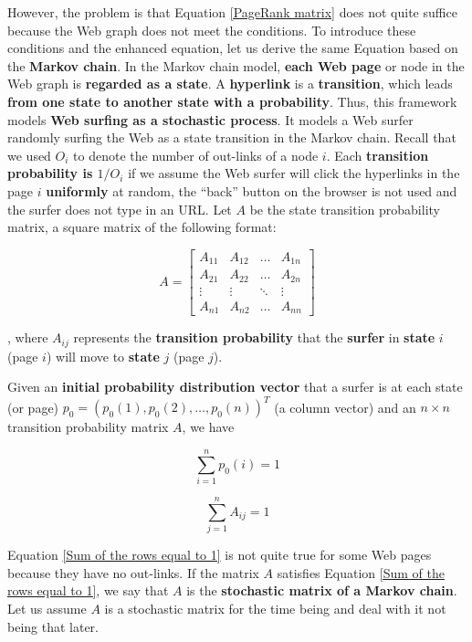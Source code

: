 However, the problem is that Equation \ref{PageRank matrix} does not quite suffice because the Web graph does not meet the conditions. To introduce these conditions and the enhanced equation, let us derive the same Equation based on the \textbf{Markov chain}. In the Markov chain model, \textbf{each Web page} or node in the Web graph is \textbf{regarded as a state}. A \textbf{hyperlink} is a \textbf{transition}, which leads \textbf{from one state to another state with a probability}. Thus, this framework models \textbf{Web surfing as a stochastic process}. It models a Web surfer randomly surfing the Web as a state transition in the Markov chain. Recall that we used $O_i$ to denote the number of out-links of a node $i$. Each \textbf{transition probability is $1/O_i$} if we assume the Web surfer will click the hyperlinks in the page $i$ \textbf{uniformly} at random, the “back” button on the browser is not used and the surfer does not type in an URL. Let $A$ be the state transition probability matrix, a square matrix of the following format:

$$
A = \begin{bmatrix}
A_{11} & A_{12} & \hdots & A_{1n}\\
A_{21} & A_{22} & \hdots & A_{2n}\\
\vdots & \vdots & \ddots & \vdots\\
A_{n1} & A_{n2} & \hdots  & A_{nn} 
\end{bmatrix}
$$

, where $A_{ij}$ represents the \textbf{transition probability} that the \textbf{surfer} in \textbf{state} $i$ (page $i$) will move to \textbf{state} $j$ (page $j$). 

Given an \textbf{initial probability distribution vector} that a surfer is at each state (or page) $p_0 = (p_0(1), p_0(2), …, p_0(n))^T$ (a column vector) and an $n \times n$ transition probability matrix $A$, we have

\begin{equation}
    \sum_{i = 1}^n p_0(i) = 1
\end{equation}

\begin{equation}\label{Sum of the rows equal to 1}
    \sum_{j = 1}^n A_{ij} = 1
\end{equation}

Equation \ref{Sum of the rows equal to 1} is not quite true for some Web pages because they have no out-links. If the matrix $A$ satisfies Equation \ref{Sum of the rows equal to 1}, we say that $A$ is the \textbf{stochastic matrix of a Markov chain}. Let us assume $A$ is a stochastic matrix for the time being and deal with it not being that later. 

